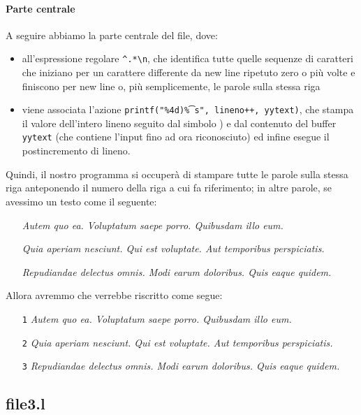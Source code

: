 \documentclass[class=book, crop=false, oneside, 12pt]{standalone}
\begin{document}
\paragraph{Parte centrale}
A seguire abbiamo la parte centrale del file, dove: 

\begin{itemize}
    \item all'espressione regolare \texttt{\^{}.*\textbackslash n}, che identifica tutte quelle sequenze di caratteri che iniziano per un carattere differente da new line ripetuto zero o più volte e finiscono per new line o, più semplicemente, le parole sulla stessa riga
    \item  viene associata l'azione \texttt{printf("\%4d)\t\%s", lineno++, yytext)}, che stampa il valore dell'intero lineno seguito dal simbolo ) e dal contenuto del buffer \texttt{yytext} (che contiene l'input fino ad ora riconosciuto) ed infine esegue il postincremento di lineno.
\end{itemize}

\noindent Quindi, il nostro programma si occuperà di stampare tutte le parole sulla stessa riga anteponendo il numero della riga a cui fa riferimento; in altre parole, se avessimo un testo come il seguente:
\begin{itemize}[noitemsep]
    \item[] \emph{Autem quo ea. Voluptatum saepe porro. Quibusdam illo eum.}
    \item[] \emph{Quia aperiam nesciunt. Qui est voluptate. Aut temporibus perspiciatis.}
    \item[] \emph{Repudiandae delectus omnis. Modi earum doloribus. Quis eaque quidem.}
\end{itemize}
Allora avremmo che verrebbe riscritto come segue:
\begin{enumerate}[noitemsep]
    \item[\texttt{1}] \emph{Autem quo ea. Voluptatum saepe porro. Quibusdam illo eum.}
    \item[\texttt{2}] \emph{Quia aperiam nesciunt. Qui est voluptate. Aut temporibus perspiciatis.}
    \item[\texttt{3}] \emph{Repudiandae delectus omnis. Modi earum doloribus. Quis eaque quidem.}
\end{enumerate}


\subsection*{file3.l}
\end{document}
